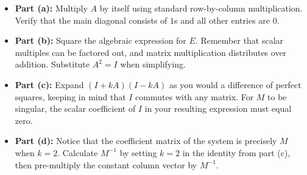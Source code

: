 \begin{hint}
\begin{itemize}
    \item \textbf{Part (a):} Multiply $A$ by itself using standard row-by-column multiplication. Verify that the main diagonal consists of $1$s and all other entries are $0$.
    \item \textbf{Part (b):} Square the algebraic expression for $E$. Remember that scalar multiples can be factored out, and matrix multiplication distributes over addition. Substitute $A^2 = I$ when simplifying.
    \item \textbf{Part (c):} Expand $(I + kA)(I - kA)$ as you would a difference of perfect squares, keeping in mind that $I$ commutes with any matrix. For $M$ to be singular, the scalar coefficient of $I$ in your resulting expression must equal zero.
    \item \textbf{Part (d):} Notice that the coefficient matrix of the system is precisely $M$ when $k=2$. Calculate $M^{-1}$ by setting $k=2$ in the identity from part (c), then pre-multiply the constant column vector by $M^{-1}$.
\end{itemize}
\end{hint}

